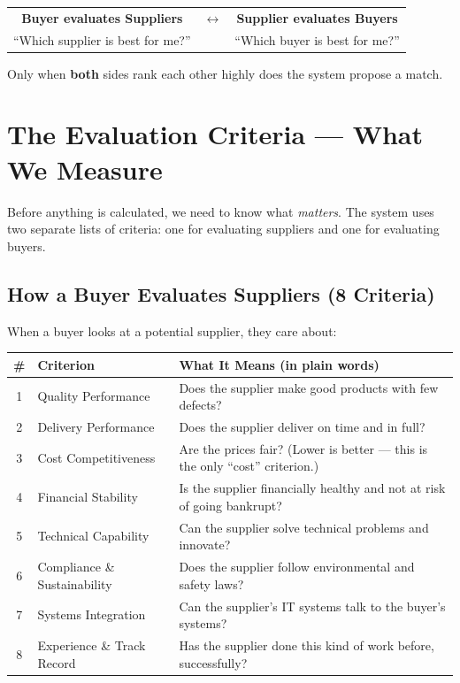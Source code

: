 \documentclass[11pt]{article}
\begin{document}
\begin{center}
\begin{tabular}{ccc}
\textbf{Buyer evaluates Suppliers} & $\longleftrightarrow$ & \textbf{Supplier evaluates Buyers} \\
``Which supplier is best for me?'' & & ``Which buyer is best for me?'' \\
\end{tabular}
\end{center}

Only when \textbf{both} sides rank each other highly does the system propose a match.

\section{The Evaluation Criteria --- What We Measure}

Before anything is calculated, we need to know what \textit{matters}. The system uses two separate lists of criteria: one for evaluating suppliers and one for evaluating buyers.

\subsection{How a Buyer Evaluates Suppliers (8 Criteria)}

When a buyer looks at a potential supplier, they care about:

\begin{center}
\small
\begin{tabular}{clp{8cm}}
\toprule
\textbf{\#} & \textbf{Criterion} & \textbf{What It Means (in plain words)} \\
\midrule
1 & Quality Performance & Does the supplier make good products with few defects? \\
2 & Delivery Performance & Does the supplier deliver on time and in full? \\
3 & Cost Competitiveness & Are the prices fair? (Lower is better --- this is the only ``cost'' criterion.) \\
4 & Financial Stability & Is the supplier financially healthy and not at risk of going bankrupt? \\
5 & Technical Capability & Can the supplier solve technical problems and innovate? \\
6 & Compliance \& Sustainability & Does the supplier follow environmental and safety laws? \\
7 & Systems Integration & Can the supplier's IT systems talk to the buyer's systems? \\
8 & Experience \& Track Record & Has the supplier done this kind of work before, successfully? \\
\bottomrule
\end{tabular}
\end{center}
\end{document}

